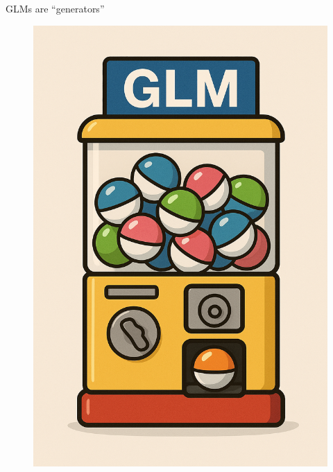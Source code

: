 \documentclass[12pt]{beamer}
\begin{document}
\begin{frame}{GLMs are ``generators''}
\begin{figure}
\centering
\includegraphics[height=0.8\textheight]{fig/gashapon-glm.png}
\end{figure}
\end{frame}
\end{document}
